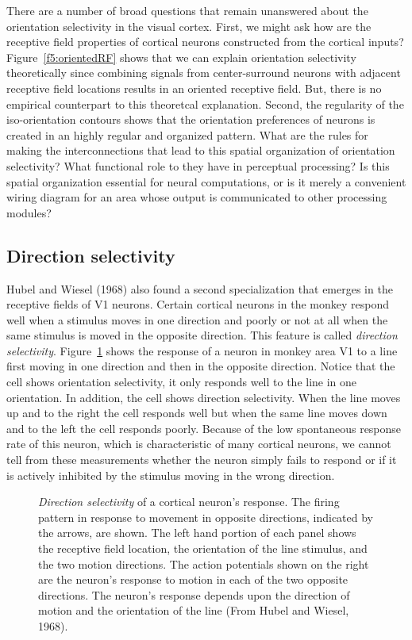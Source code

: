 There are a number of broad questions that remain unanswered
about the orientation selectivity in the visual cortex.
First, we might
ask how are the receptive field properties of cortical neurons
constructed from the cortical inputs?
Figure~\ref{f5:orientedRF} shows
that we can explain orientation selectivity theoretically
since combining signals from
center-surround neurons with adjacent receptive field locations
results in an oriented receptive field.
But, there is no empirical counterpart to this theoretcal
explanation.
Second, the regularity of the iso-orientation contours
shows that the orientation preferences of neurons
is created in an highly regular and organized pattern.
What are the rules
for making the interconnections that lead to this 
spatial organization of orientation selectivity?
What functional role to they have in perceptual processing?
Is this spatial organization essential for neural computations,
or is it merely a convenient wiring diagram for an area whose
output is communicated to other processing modules?

\subsection*{Direction selectivity}
Hubel and Wiesel (1968) also found a second specialization
that emerges in the receptive fields of V1 neurons.
Certain cortical neurons in the monkey respond well
when a stimulus moves in one direction
and poorly or not at all when the same 
stimulus is moved in the opposite direction.
This feature is called {\em direction selectivity}.
Figure~\ref{f5:dir.selective} shows the response of a
neuron in monkey area V1 to a line first
moving in one direction and then in the opposite direction.
Notice that the cell shows orientation selectivity, it only
responds well to the line in one orientation.
In addition, the cell shows direction selectivity.
When the line moves up and to the right the
cell responds well but when the same line moves down
and to the left the cell responds poorly.
Because of the low spontaneous response rate of this neuron,
which is characteristic of many cortical neurons,
we cannot tell from these measurements whether
the neuron simply fails to respond or if it is actively inhibited
by the stimulus moving in the wrong direction.
\begin{figure}
\centerline {
}
\caption[Direction Selectivity]{
{\em Direction selectivity} of a cortical neuron's response.
The firing pattern in response to movement in opposite directions,
indicated by the arrows, are shown.
The left hand portion of each panel shows the receptive
field location, the orientation of the line stimulus, and the 
two motion directions.
The action potentials shown on the right are the neuron's
response to motion in each of the two opposite directions.
The neuron's response depends upon the direction of motion
and the orientation of the line
(From Hubel and Wiesel, 1968).
}
\label{f5:dir.selective}
\end{figure}

